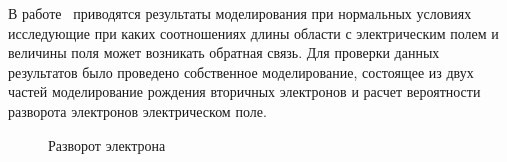 В работе~\cite{dwyer2003fundamental} приводятся результаты моделирования при нормальных условиях исследующие при каких соотношениях длины области с электрическим полем и величины поля может возникать обратная связь. Для проверки данных результатов было проведено собственное моделирование, состоящее из двух частей моделирование рождения вторичных электронов и расчет вероятности разворота электронов электрическом поле. 

\begin{figure}[ph!]
    \begin{center}
        \begin{minipage}[h]{0.49\linewidth}
        \end{minipage}
        \hfill
        \begin{minipage}[h]{0.49\linewidth}
        \end{minipage}
        \vfill
        \begin{minipage}[h]{0.49\linewidth}
        \end{minipage}
        \hfill
        \begin{minipage}[h]{0.49\linewidth}
        \end{minipage}
        \vfill
        \begin{minipage}[h]{0.49\linewidth}
        \end{minipage}
        \hfill
        \begin{minipage}[h]{0.49\linewidth}
        \end{minipage}
        \caption{Разворот электрона}
    \end{center}
    \label{fig:storm:reverse_nc_1}
\end{figure}
